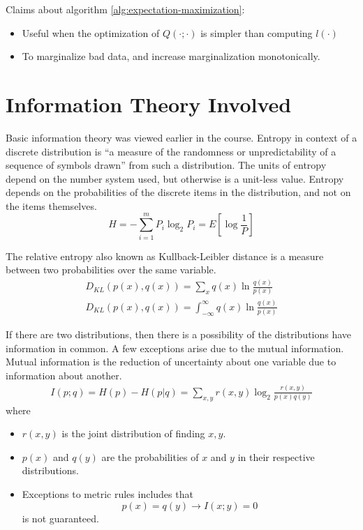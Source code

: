 \documentclass[11pt]{article}
\begin{document}
Claims about algorithm \ref{alg:expectation-maximization}:
\begin{itemize}
	\item Useful when the optimization of $Q(\cdot ; \cdot)$ is simpler than computing $l(\cdot)$
	\item To marginalize bad data, and increase marginalization monotonically. 
\end{itemize}


\section{Information Theory Involved}
Basic information theory was viewed earlier in the course.   Entropy in context of a discrete distribution is ``a measure of the randomness or unpredictability of a sequence of symbols drawn'' \cite[630]{duda-hart-stork} from such a distribution.  The units of entropy depend on the number system used, but otherwise is a unit-less value.  Entropy depends on the probabilities of the discrete items in the distribution, and not on the items themselves. 
\newpage
\begin{equation}
H = - \sum _{i=1}^m P_i \log _2 P_i = E[ \log \frac{1}{P}]
\end{equation}

The relative entropy also known as Kullback-Leibler distance is a measure between two probabilities over the same variable.  
\begin{eqnarray}
	D_{KL}(p(x), q(x)) = \sum _{x} q(x) \ln \frac{q(x)}{p(x)} \\
	D_{KL}(p(x), q(x)) = \int _{-\infty} ^{\infty} q(x) \ln \frac{q(x)}{p(x)} 
\end{eqnarray}

If there are two distributions, then there is a possibility of the distributions have information in common.  A few exceptions arise due to the mutual information.  Mutual information is the reduction of uncertainty about one variable due to information about another. 
\begin{eqnarray}
	I(p ; q) = H(p) - H(p | q) = \sum_{x,y} r(x,y) \log _2 \frac{r(x,y)} {p(x)q(y)}
\end{eqnarray}
where 
\begin{itemize}
	\item $r(x,y)$ is the joint distribution of finding $x,y$.
	\item $p(x)$ and $q(y)$ are the probabilities of $x$ and $y$ in their respective distributions. 
	\item Exceptions to metric rules includes that
		\begin{equation}
		p(x) = q(y) \to I(x; y) =0		
		\end{equation}
		 is not guaranteed.	
\end{itemize}
\end{document}
